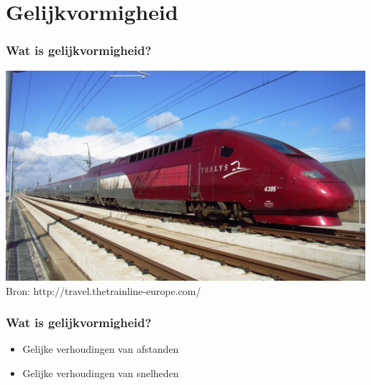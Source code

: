 \documentclass[t]{beamer}
\begin{document}
	\section{Gelijkvormigheid}	
  	\begin{frame}
		\frametitle{Wat is gelijkvormigheid?}
		\vspace{0.5cm}
		\centering
		\includegraphics[height=0.7\textheight]{fig/gelijkvormigheid/thalys1.jpg}\\
		\footnotesize{Bron: http://travel.thetrainline-europe.com/}
  	\end{frame}
  	\begin{frame}
		\frametitle{Wat is gelijkvormigheid?}
		
		\begin{itemize}
			\item<2-3> Gelijke verhoudingen van afstanden
			\item<3-3> Gelijke verhoudingen van snelheden
		\end{itemize}

        \vspace{0.1cm}
               
		
  	\end{frame}
\end{document}
